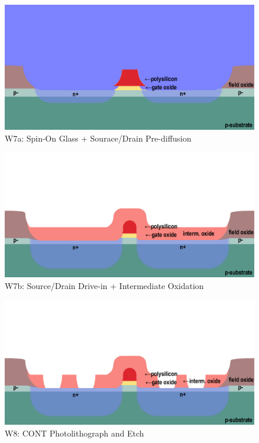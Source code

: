 \documentclass{article}
\begin{document}
\begin{figure}[H]
\centering
\includegraphics[width=350pt]{CrossSections/MOSFETlabprofiles/MOSFETw7a.png}
\caption{W7a: Spin-On Glass + Sourace/Drain Pre-diffusion}
\end{figure}
\begin{figure}[H]
\centering
\includegraphics[width=350pt]{CrossSections/MOSFETlabprofiles/MOSFETw7b.png}
\caption{W7b: Source/Drain Drive-in + Intermediate Oxidation}
\end{figure}
\begin{figure}[H]
\centering
\includegraphics[width=350pt]{CrossSections/MOSFETlabprofiles/MOSFETw8.png}
\caption{W8: CONT Photolithograph and Etch}
\end{figure}
\end{document}
